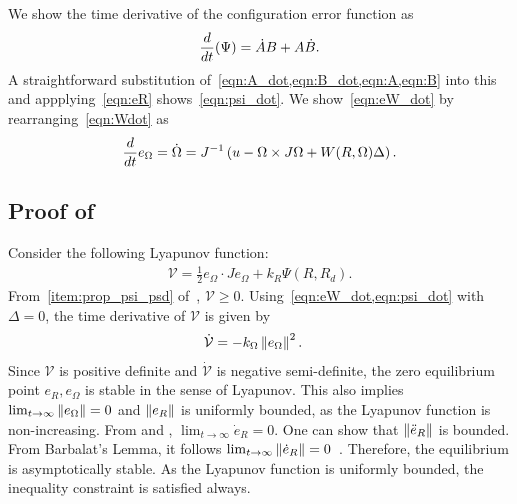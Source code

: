 \documentclass[letterpaper, 10 pt, conference]{ieeeconf}  %
\begin{document}
We show the time derivative of the configuration error function as
\begin{gather*}
	\frac{d }{d t} (\Psi) = \dot{A} B + A \dot{B} .
\end{gather*}
A straightforward substitution of~\cref{eqn:A_dot,eqn:B_dot,eqn:A,eqn:B} into this and appplying~\cref{eqn:eR} shows~\cref{eqn:psi_dot}.
We show~\cref{eqn:eW_dot} by rearranging~\cref{eqn:Wdot} as 
\begin{align*}
	\frac{d }{d t} e_\Omega = \dot{\Omega} = J^{-1} \left( u - \Omega \times J \Omega + W(R,\Omega) \Delta  \right) .
\end{align*}
\subsection{Proof of~}\label{proof:att_control}
Consider the following Lyapunov function:
	\begin{gather}
		\mathcal{V} = \frac{1}{2} e_\Omega \cdot J e_\Omega + k_R \Psi(R,R_d) . \label{eqn:v_nodist}
	\end{gather}
	From~\cref{item:prop_psi_psd} of~, \(\mathcal{V} \geq 0 \).
	Using~\cref{eqn:eW_dot,eqn:psi_dot} with \( \Delta = 0 \), the time derivative of \( \mathcal{V} \) is given by
	\begin{align}
		\dot{\mathcal{V}} &= -k_\Omega \left\| e_\Omega \right\|^2 . \label{eqn:vdot_nodist}
	\end{align}
	Since \( \mathcal{V} \) is positive definite and \( \dot{\mathcal{V}} \) is negative semi-definite, the zero equilibrium point \( e_R, e_\Omega \) is stable in the sense of Lyapunov. This also implies \( \lim_{t\to\infty} \left\| e_\Omega \right\| = 0 \) and \( \left\| e_R \right\| \) is uniformly bounded, as the Lyapunov function is non-increasing. From  and , $\lim_{t\to\infty} \dot e_R =0$. 
	One can show that \( \left\| \ddot{e}_R \right\| \) is bounded.
	From Barbalat's Lemma, it follows \( \lim_{t\to\infty}\left\| \dot{e}_R \right\| = 0 \)~\cite[Lemma 8.2]{khalil1996}. Therefore, the equilibrium is asymptotically stable. As the Lyapunov function is uniformly bounded, the inequality constraint is satisfied always.
	
\end{document}
